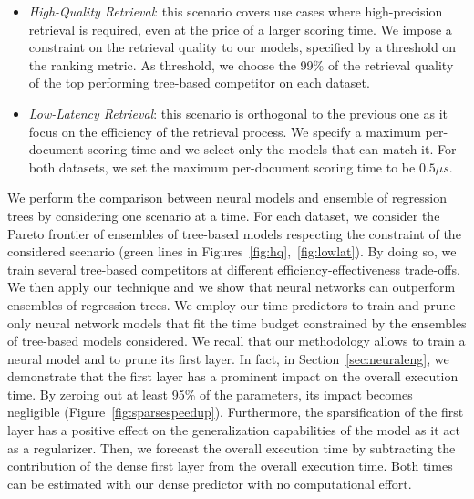 \begin{itemize}
	\item \textit{High-Quality Retrieval}: this scenario covers use cases where high-precision retrieval is required, even at the price of a larger scoring time. We impose a constraint on the retrieval quality to our models, specified by a threshold on the ranking metric. As threshold, we choose the 99\% of the retrieval quality of the top performing tree-based competitor on each dataset.
	\item \textit{Low-Latency Retrieval}: this scenario is orthogonal to the previous one as it focus on the efficiency of the retrieval process. We specify a maximum per-document scoring time and we select only the models that can match it. For both datasets, we set the maximum per-document scoring time to be $0.5\mu s$.
\end{itemize}
We perform the comparison between neural models and ensemble of regression trees by considering one scenario at a time. For each dataset, we consider the Pareto frontier of ensembles of tree-based models respecting the constraint of the considered scenario (green lines in Figures~\ref{fig:hq},~\ref{fig:lowlat}). By doing so, we train several tree-based competitors at different efficiency-effectiveness trade-offs. We then apply our technique and we show that neural networks can outperform ensembles of regression trees. We employ our time predictors to train and prune only neural network models that fit the time budget constrained by the ensembles of tree-based models considered. We recall that our methodology allows to train a neural model and to prune its first layer. In fact, in Section~\ref{sec:neuraleng}, we demonstrate that the first layer has a prominent impact on the overall execution time. By zeroing out at least  95\% of the parameters, its impact becomes negligible (Figure~\ref{fig:sparsespeedup}). Furthermore, the sparsification of the first layer has a positive effect on the generalization capabilities of the model as it act as a regularizer.
Then, we forecast the overall execution time by subtracting the contribution of the dense first layer from the overall execution time. Both times can be estimated with our dense predictor with no computational effort.

